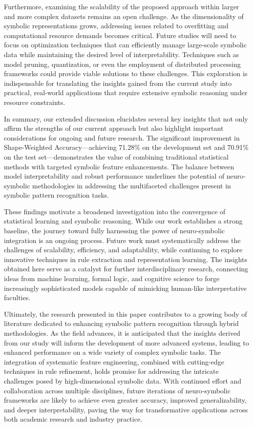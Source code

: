 \documentclass{article}
\begin{document}
Furthermore, examining the scalability of the proposed approach within larger and more complex datasets remains an open challenge. As the dimensionality of symbolic representations grows, addressing issues related to overfitting and computational resource demands becomes critical. Future studies will need to focus on optimization techniques that can efficiently manage large-scale symbolic data while maintaining the desired level of interpretability. Techniques such as model pruning, quantization, or even the employment of distributed processing frameworks could provide viable solutions to these challenges. This exploration is indispensable for translating the insights gained from the current study into practical, real-world applications that require extensive symbolic reasoning under resource constraints.

In summary, our extended discussion elucidates several key insights that not only affirm the strengths of our current approach but also highlight important considerations for ongoing and future research. The significant improvement in Shape-Weighted Accuracy—achieving 71.28\% on the development set and 70.91\% on the test set—demonstrates the value of combining traditional statistical methods with targeted symbolic feature enhancements. The balance between model interpretability and robust performance underlines the potential of neuro‐symbolic methodologies in addressing the multifaceted challenges present in symbolic pattern recognition tasks.

These findings motivate a broadened investigation into the convergence of statistical learning and symbolic reasoning. While our work establishes a strong baseline, the journey toward fully harnessing the power of neuro‐symbolic integration is an ongoing process. Future work must systematically address the challenges of scalability, efficiency, and adaptability, while continuing to explore innovative techniques in rule extraction and representation learning. The insights obtained here serve as a catalyst for further interdisciplinary research, connecting ideas from machine learning, formal logic, and cognitive science to forge increasingly sophisticated models capable of mimicking human-like interpretative faculties.

Ultimately, the research presented in this paper contributes to a growing body of literature dedicated to enhancing symbolic pattern recognition through hybrid methodologies. As the field advances, it is anticipated that the insights derived from our study will inform the development of more advanced systems, leading to enhanced performance on a wide variety of complex symbolic tasks. The integration of systematic feature engineering, combined with cutting-edge techniques in rule refinement, holds promise for addressing the intricate challenges posed by high-dimensional symbolic data. With continued effort and collaboration across multiple disciplines, future iterations of neuro‐symbolic frameworks are likely to achieve even greater accuracy, improved generalizability, and deeper interpretability, paving the way for transformative applications across both academic research and industry practice.
\end{document}
